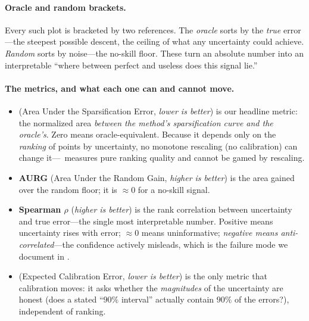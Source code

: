 \paragraph{Oracle and random brackets.} Every such plot is bracketed by two references. The
\emph{oracle} sorts by the \emph{true} error---the steepest possible descent, the ceiling of what any
uncertainty could achieve. \emph{Random} sorts by noise---the no-skill floor. These turn an absolute
number into an interpretable ``where between perfect and useless does this signal lie.''

\paragraph{The metrics, and what each one can and cannot move.}
\begin{itemize}[leftmargin=1.4em,itemsep=2pt,topsep=2pt]
\item \textbf{\ause} (Area Under the Sparsification Error, \emph{lower is better}) is our headline
metric: the normalized area \emph{between the method's sparsification curve and the oracle's}. Zero
means oracle-equivalent. Because it depends only on the \emph{ranking} of points by uncertainty, no
monotone rescaling (no calibration) can change it---\ause\ measures pure ranking quality and cannot
be gamed by rescaling.
\item \textbf{AURG} (Area Under the Random Gain, \emph{higher is better}) is the area gained over the
random floor; it is $\approx 0$ for a no-skill signal.
\item \textbf{Spearman $\rho$} (\emph{higher is better}) is the rank correlation between uncertainty
and true error---the single most interpretable number. Positive means uncertainty rises with error;
$\approx 0$ means uninformative; \emph{negative means anti-correlated}---the confidence actively
misleads, which is the failure mode we document in .
\item \textbf{\ece} (Expected Calibration Error, \emph{lower is better}) is the only metric that
calibration moves: it asks whether the \emph{magnitudes} of the uncertainty are honest (does a stated
``$90\%$ interval'' actually contain $90\%$ of the errors?), independent of ranking.
\end{itemize}

